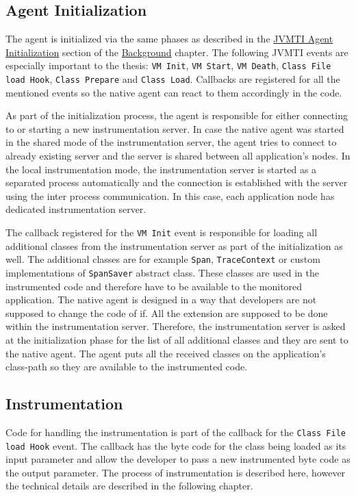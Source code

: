 \subsection{Agent Initialization}
The agent is initialized via the same phases as described in the \hyperref[subsec:jvmti_init]{JVMTI Agent Initialization}  section of the \hyperref[chap:background]{Background} chapter. The following JVMTI events are especially important to the thesis: \texttt{VM Init}, \texttt{VM Start}, \texttt{VM Death}, \texttt{Class File load Hook}, \texttt{Class Prepare} and \texttt{Class Load}. Callbacks are registered for all the mentioned events so the native agent can react to them accordingly in the code.

As part of the initialization process, the agent is responsible for either connecting to or starting a new instrumentation server. In case the native agent was started in the shared mode of the instrumentation server, the agent tries to connect to already existing server and the server is shared between all application's nodes. In the local instrumentation mode, the instrumentation server is started as a separated process automatically and the connection is established with the server using the inter process communication. In this case, each application node has dedicated instrumentation server.

The callback registered for the \texttt{VM Init} event is responsible for loading all additional classes from the instrumentation server as part of the initialization as well. The additional classes are for example \texttt{Span}, \texttt{TraceContext} or custom implementations of \texttt{SpanSaver} abstract class. These classes are used in the instrumented code and therefore have to be available to the monitored application. The native agent is designed in a way that developers are not supposed to change the code of if. All the extension are supposed to be done within the instrumentation server. Therefore, the instrumentation server is asked at the initialization phase for the list of all additional classes and they are sent to the native agent. The agent puts all the received classes on the application's class-path so they are available to the instrumented code.

\subsection{Instrumentation}
Code for handling the instrumentation is part of the callback for the \texttt{Class File load Hook} event. The callback has the byte code for the class being loaded as its input parameter and allow the developer to pass a new instrumented byte code as the output parameter. The process of instrumentation is described here, however the technical details are described in the following chapter.

